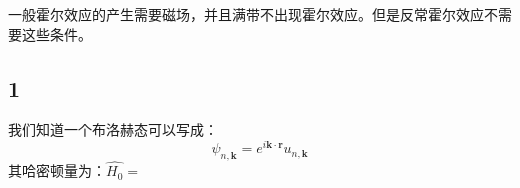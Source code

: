 \begin{issues}
\issueDraft
\end{issues}
一般霍尔效应的产生需要磁场，并且满带不出现霍尔效应。但是反常霍尔效应不需要这些条件。
\subsection{1}
我们知道一个布洛赫态可以写成：
\begin{equation}
\psi_{n,\boldsymbol{k}}=e^{i\boldsymbol{k}\cdot\boldsymbol{r}}u_{n,\boldsymbol{k}}
\end{equation}
其哈密顿量为：$\hat{H_0}=$
